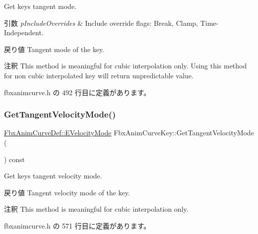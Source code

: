 Get key\textquotesingle{}s tangent mode. 
\begin{DoxyParams}{引数}
{\em p\+Include\+Overrides} & Include override flags\+: Break, Clamp, Time-\/\+Independent. \\
\hline
\end{DoxyParams}
\begin{DoxyReturn}{戻り値}
Tangent mode of the key. 
\end{DoxyReturn}
\begin{DoxyRemark}{注釈}
This method is meaningful for cubic interpolation only. Using this method for non cubic interpolated key will return unpredictable value. 
\end{DoxyRemark}


 fbxanimcurve.\+h の 492 行目に定義があります。

\mbox{\label{class_fbx_anim_curve_key_af8b7bc72b42857f9a713ca3f443cd55b}} 
\subsubsection{\texorpdfstring{Get\+Tangent\+Velocity\+Mode()}{GetTangentVelocityMode()}}
{\footnotesize\ttfamily \hyperlink{class_fbx_anim_curve_def_a747576beffa78ab236d2e140da395fff}{Fbx\+Anim\+Curve\+Def\+::\+E\+Velocity\+Mode} Fbx\+Anim\+Curve\+Key\+::\+Get\+Tangent\+Velocity\+Mode (\begin{DoxyParamCaption}{ }\end{DoxyParamCaption}) const\hspace{0.3cm}{\ttfamily [inline]}}

Get key\textquotesingle{}s tangent velocity mode. \begin{DoxyReturn}{戻り値}
Tangent velocity mode of the key. 
\end{DoxyReturn}
\begin{DoxyRemark}{注釈}
This method is meaningful for cubic interpolation only. 
\end{DoxyRemark}


 fbxanimcurve.\+h の 571 行目に定義があります。

\mbox{\label{class_fbx_anim_curve_key_ada99141bd5cd9218fe7eaa4ce00ae5db}} 
